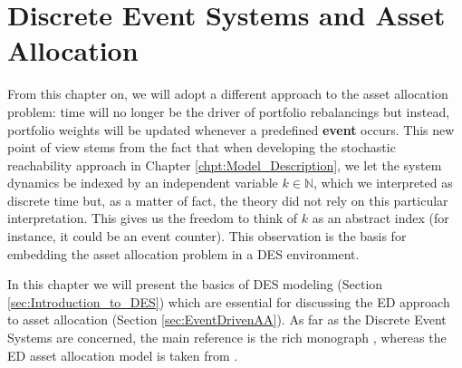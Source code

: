 \chapter{Discrete Event Systems and Asset Allocation}\label{chpt:ED}
From this chapter on, we will adopt a different approach to the asset allocation problem: time will no longer be the driver of portfolio rebalancings but instead, portfolio weights  will be updated whenever a predefined \textbf{event} occurs. This new point of view stems from the fact that when developing the stochastic reachability approach in Chapter \ref{chpt:Model_Description}, we let the system dynamics be indexed by an independent variable $k \in \mathbb{N}$, which we interpreted as discrete time but, as a matter of fact, the theory did not rely on this particular interpretation. This gives us the freedom to think of $k$ as an abstract index (for instance, it could be an event counter). This observation is the basis for embedding the asset allocation problem in a \gls{DES} environment. 

In this chapter we will present the basics of \gls{DES} modeling (Section \ref{sec:Introduction_to_DES}) which are essential for discussing the \gls{ED} approach to asset allocation (Section \ref{sec:EventDrivenAA}). As far as the Discrete Event Systems are concerned, the main reference is the rich monograph \cite{cassandras2009}, whereas the \gls{ED} asset allocation model is taken from \cite{specchio2011}.

